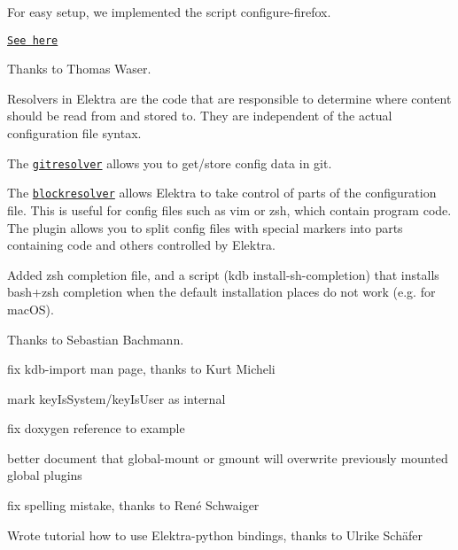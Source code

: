 For easy setup, we implemented the script {\ttfamily configure-\/firefox}.

\href{https://master.libelektra.org/src/bindings/intercept}{\tt See here}

Thanks to Thomas Waser.

Resolvers in Elektra are the code that are responsible to determine where content should be read from and stored to. They are independent of the actual configuration file syntax.

The \href{https://master.libelektra.org/src/plugins/gitresolver}{\tt gitresolver} allows you to get/store config data in git.

The \href{https://master.libelektra.org/src/plugins/blockresolver}{\tt blockresolver} allows Elektra to take control of parts of the configuration file. This is useful for config files such as vim or zsh, which contain program code. The plugin allows you to split config files with special markers into parts containing code and others controlled by Elektra.

Added zsh completion file, and a script ({\ttfamily kdb install-\/sh-\/completion}) that installs bash+zsh completion when the default installation places do not work (e.\+g. for mac\+OS).

Thanks to Sebastian Bachmann.


\begin{DoxyItemize}
\item fix {\ttfamily kdb-\/import} man page, thanks to Kurt Micheli
\item mark {\ttfamily key\+Is\+System}/{\ttfamily key\+Is\+User} as internal
\item fix doxygen reference to example
\item better document that {\ttfamily global-\/mount} or {\ttfamily gmount} will overwrite previously mounted global plugins
\item fix spelling mistake, thanks to René Schwaiger
\item Wrote tutorial how to use Elektra-\/python bindings, thanks to Ulrike Schäfer
\end{DoxyItemize}


